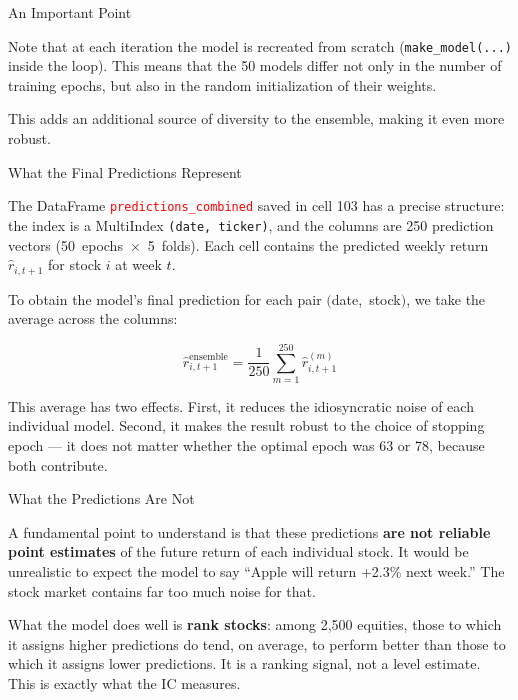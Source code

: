 \documentclass[aspectratio=169, 11pt]{beamer}
\begin{document}
%
%
\begin{frame}{An Important Point}

Note that at each iteration the model is recreated from scratch (\texttt{make\_model(...)} inside the loop). This means that the 50 models differ not only in the number of training epochs, but also in the random initialization of their weights.

\vspace{0.3cm}

This adds an additional source of diversity to the ensemble, making it even more robust.

\end{frame}
%
%
\begin{frame}{What the Final Predictions Represent}

The DataFrame \texttt{\textcolor{red}{predictions\_combined}} saved in cell 103 has a precise structure:
the index is a MultiIndex \texttt{(date, ticker)}, and the columns are 250 prediction vectors
\mbox{(50 epochs $\times$ 5 folds).} Each cell contains the predicted weekly return
$\hat{r}_{i,t+1}$ for stock $i$ at week $t$.

\vspace{0.4cm}

To obtain the model's final prediction for each pair \mbox{$($date, stock$)$,} we take the average
across the columns:

\vspace{0.5cm}

\[
\hat{r}^{\mathrm{ensemble}}_{i,t+1}
=
\frac{1}{250}\sum_{m=1}^{250}\hat{r}^{(m)}_{i,t+1}
\]

\vspace{0.5cm}

This average has two effects. First, it reduces the idiosyncratic noise of each individual
model. Second, it makes the result robust to the choice of stopping epoch --- it does not
matter whether the optimal epoch was 63 or 78, because both contribute.

\end{frame}
%
%
\begin{frame}{What the Predictions Are Not}

A fundamental point to understand is that these predictions \textbf{are not reliable point estimates}
of the future return of each individual stock. It would be unrealistic to expect the model
to say ``Apple will return +2.3\% next week.'' The stock market contains far too much noise
for that.

\vspace{0.4cm}

What the model does well is \textbf{rank stocks}: among 2{,}500 equities, those to which it assigns
higher predictions do tend, on average, to perform better than those to which it assigns lower
predictions. It is a ranking signal, not a level estimate. This is exactly what the IC measures.

\end{frame}
\end{document}
